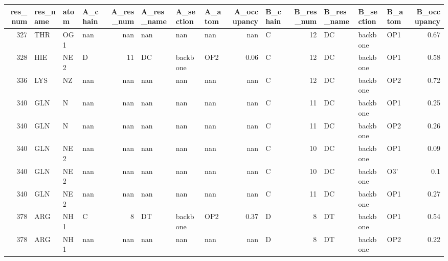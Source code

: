 \begin{longtable}{rlllrlllrlrlllr}
\hline
   res\_num & res\_name   & atom   & A\_chain   &   A\_res\_num & A\_res\_name   & A\_section   & A\_atom   &   A\_occupancy & B\_chain   &   B\_res\_num & B\_res\_name   & B\_section   & B\_atom   &   B\_occupancy \\
\hline
\endhead
       327 & THR        & OG1    & nan       &         nan & nan          & nan         & nan      &        nan    & C         &          12 & DC           & backbone    & OP1      &          0.67 \\
       328 & HIE        & NE2    & D         &          11 & DC           & backbone    & OP2      &          0.06 & C         &          12 & DC           & backbone    & OP1      &          0.58 \\
       336 & LYS        & NZ     & nan       &         nan & nan          & nan         & nan      &        nan    & C         &          12 & DC           & backbone    & OP2      &          0.72 \\
       340 & GLN        & N      & nan       &         nan & nan          & nan         & nan      &        nan    & C         &          11 & DC           & backbone    & OP1      &          0.25 \\
       340 & GLN        & N      & nan       &         nan & nan          & nan         & nan      &        nan    & C         &          11 & DC           & backbone    & OP2      &          0.26 \\
       340 & GLN        & NE2    & nan       &         nan & nan          & nan         & nan      &        nan    & C         &          10 & DC           & backbone    & OP1      &          0.09 \\
       340 & GLN        & NE2    & nan       &         nan & nan          & nan         & nan      &        nan    & C         &          10 & DC           & backbone    & O3'      &          0.1  \\
       340 & GLN        & NE2    & nan       &         nan & nan          & nan         & nan      &        nan    & C         &          11 & DC           & backbone    & OP1      &          0.27 \\
       378 & ARG        & NH1    & C         &           8 & DT           & backbone    & OP2      &          0.37 & D         &           8 & DT           & backbone    & OP1      &          0.54 \\
       378 & ARG        & NH1    & nan       &         nan & nan          & nan         & nan      &        nan    & D         &           8 & DT           & backbone    & OP2      &          0.22 \\

\end{longtable}

